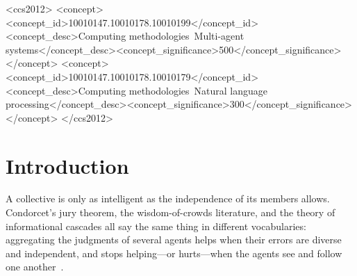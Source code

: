 \documentclass[manuscript, screen, review]{acmart}
\begin{document}
\begin{abstract}
Across all methods, including debate-style baselines, collaboration improves on a single chain-of-thought call by at most about two points.
Taken together, homogeneous LLM collectives exhibit highly correlated judgments and limited error correction, which undermines a key condition for collective intelligence; decomposing their behaviour into detection, challenge, and repair shows that the dominant loss occurs before reconsideration begins, and that in this setting the binding constraint is the independence of the members---in particular their exposure to the candidate answer---rather than the representation of shared state or the communication topology. Collective intelligence in such systems requires not merely multiple agents but sufficiently independent evidence generation together with selective external oversight. We propose the agreement and repair statistics introduced here as standard diagnostics for multi-agent reasoning systems.
\end{abstract}

\begin{CCSXML}
<ccs2012>
<concept><concept_id>10010147.10010178.10010199</concept_id><concept_desc>Computing methodologies~Multi-agent systems</concept_desc><concept_significance>500</concept_significance></concept>
<concept><concept_id>10010147.10010178.10010179</concept_id><concept_desc>Computing methodologies~Natural language processing</concept_desc><concept_significance>300</concept_significance></concept>
</ccs2012>
\end{CCSXML}



\maketitle

\section{Introduction}

A collective is only as intelligent as the independence of its members allows.
Condorcet's jury theorem, the wisdom-of-crowds literature, and the theory of informational cascades all say the same thing in different vocabularies: aggregating the judgments of several agents helps when their errors are diverse and independent, and stops helping---or hurts---when the agents see and follow one another~\cite{ladha1992condorcet,surowiecki2004wisdom,lorenz2011social,bikhchandani1992cascades}.
\end{document}
